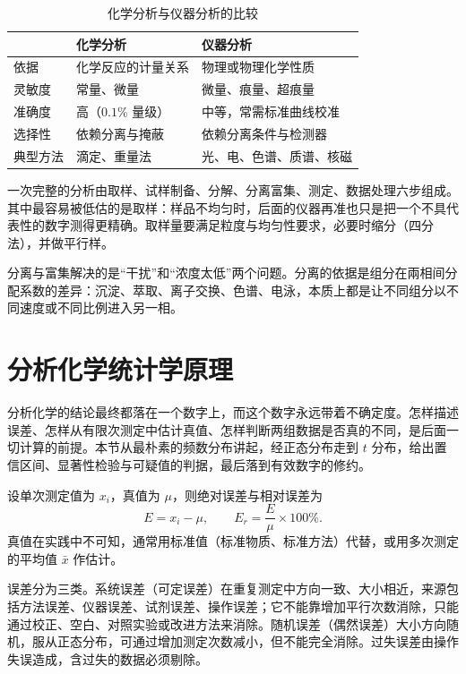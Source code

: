 \documentclass[UTF8]{ctexbook}
\begin{document}
\begin{table}[H]
\centering
\caption{化学分析与仪器分析的比较}
\begin{tabular}{p{2.6cm}p{5.6cm}p{6.2cm}}
\toprule
 & 化学分析 & 仪器分析 \\
\midrule
依据 & 化学反应的计量关系 & 物理或物理化学性质 \\
灵敏度 & 常量、微量 & 微量、痕量、超痕量 \\
准确度 & 高（$0.1\%$ 量级） & 中等，常需标准曲线校准 \\
选择性 & 依赖分离与掩蔽 & 依赖分离条件与检测器 \\
典型方法 & 滴定、重量法 & 光、电、色谱、质谱、核磁 \\
\bottomrule
\end{tabular}
\end{table}

一次完整的分析由取样、试样制备、分解、分离富集、测定、数据处理六步组成。其中最容易被低估的是取样：样品不均匀时，后面的仪器再准也只是把一个不具代表性的数字测得更精确。取样量要满足粒度与均匀性要求，必要时缩分（四分法），并做平行样。

分离与富集解决的是“干扰”和“浓度太低”两个问题。分离的依据是组分在兩相间分配系数的差异：沉淀、萃取、离子交换、色谱、电泳，本质上都是让不同组分以不同速度或不同比例进入另一相。

\newpage





\section{分析化学统计学原理}

分析化学的结论最终都落在一个数字上，而这个数字永远带着不确定度。怎样描述误差、怎样从有限次测定中估计真值、怎样判断两组数据是否真的不同，是后面一切计算的前提。本节从最朴素的频数分布讲起，经正态分布走到 $t$ 分布，给出置信区间、显著性检验与可疑值的判据，最后落到有效数字的修约。

设单次测定值为 $x_i$，真值为 $\mu$，则绝对误差与相对误差为
\[
E=x_i-\mu,\qquad E_r=\frac{E}{\mu}\times100\%.
\]
真值在实践中不可知，通常用标准值（标准物质、标准方法）代替，或用多次测定的平均值 $\bar{x}$ 作估计。

误差分为三类。系统误差（可定误差）在重复测定中方向一致、大小相近，来源包括方法误差、仪器误差、试剂误差、操作误差；它不能靠增加平行次数消除，只能通过校正、空白、对照实验或改进方法来消除。随机误差（偶然误差）大小方向随机，服从正态分布，可通过增加测定次数减小，但不能完全消除。过失误差由操作失误造成，含过失的数据必须剔除。
\end{document}
